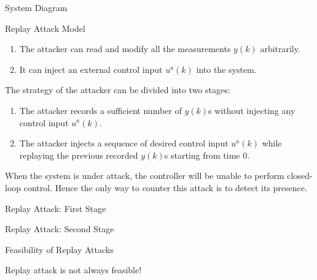 \documentclass[10pt]{beamer}
\newlength\figureheight
\newlength\figurewidth
\newcommand{\tikzdir}[1]{#1.tikz}
\newcommand{\inputtikz}[1]{}}
\begin{document}
  \begin{frame}{System Diagram}
    \begin{figure}[htpb]
      \begin{center}
	\inputtikz{systemdiagram}
      \end{center}
    \end{figure}
  \end{frame}

  \begin{frame}{Replay Attack Model}
    \begin{enumerate}
      \item The attacker can read and modify all the measurements $y(k)$ arbitrarily.
      \item It can inject an external control input $u^a(k)$ into the system. 
    \end{enumerate}
    The strategy of the attacker can be divided into two stages:
    \begin{enumerate}
      \item The attacker records a sufficient number of $y(k)$s without injecting any control input $u^a(k)$. 
      \item The attacker injects a sequence of desired control input $u^a(k)$ while replaying the previous recorded $y(k)$s starting from time $0$.
    \end{enumerate}
    When the system is under attack, the controller will be unable to perform closed-loop control. Hence the only way to counter this attack is to detect its presence. 
  \end{frame}

  \begin{frame}{Replay Attack: First Stage}
    \begin{figure}[htpb]
      \begin{center}
	\inputtikz{replaydiagramone}
      \end{center}
    \end{figure}
  \end{frame}

  \begin{frame}{Replay Attack: Second Stage}
    \begin{figure}[htpb]
      \begin{center}
	\inputtikz{replaydiagramtwo}
      \end{center}
    \end{figure}
  \end{frame}

  \begin{frame}{Feasibility of Replay Attacks}
    \begin{figure}[htpb]
      \setlength\figureheight{4.5cm}
      \setlength\figurewidth{10cm}
      \begin{center}
	\inputtikz{replayunstableA2}
      \end{center}
    \end{figure}
    Replay attack is not always feasible!
  \end{frame}
\end{document}
